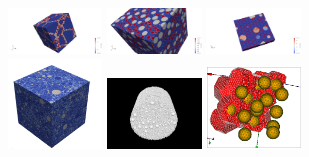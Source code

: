 \documentclass{beamer}
\begin{document}
\begin{frame}{\\\hspace*{1cm}
    }
\vspace*{2mm}
\hspace*{1cm}\includegraphics[width=2.5cm]{ver/Laguerre_Filamentaire1.png}
\hspace*{2mm}\includegraphics[width=2.5cm]{ver/Voxels_composites1.png}
\hspace*{2mm}\includegraphics[width=2.5cm]{ver/Mask_final1.png}
\\
\hspace*{1cm}\includegraphics[width=2.5cm]{ver/Chps_Gauss.png}
\hspace*{2mm}\includegraphics[width=2.5cm]{ver/Cylinder_3D.png}
\hspace*{2mm}\includegraphics[trim = .1cm .1cm .1cm .1cm,clip,width=2.5cm]{ver/Maillage_vraiment_periodique1.png}
\end{frame}
\end{document}
